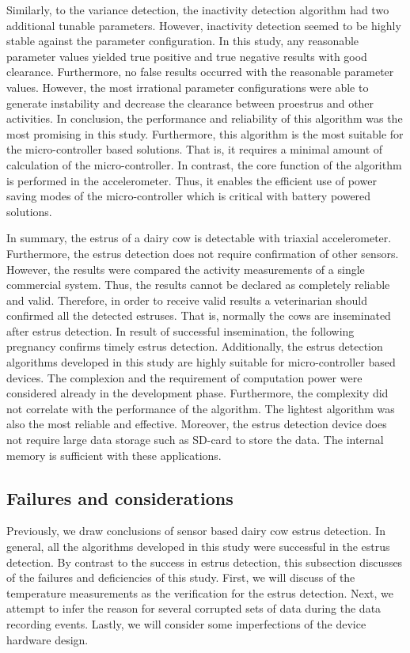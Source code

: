 \documentclass[english,12pt,a4paper,pdftex,elec,utf8]{aaltothesis}
\begin{document}
Similarly, to the variance detection, the inactivity detection algorithm had two additional tunable parameters. However, inactivity detection seemed to be highly stable against the parameter configuration. In this study, any reasonable parameter values yielded true positive and true negative results with good clearance. Furthermore, no false results occurred with the reasonable parameter values. However, the most irrational parameter configurations were able to generate instability and decrease the clearance between proestrus and other activities. In conclusion, the performance and reliability of this algorithm was the most promising in this study. Furthermore, this algorithm is the most suitable for the micro-controller based solutions. That is, it requires a minimal amount of calculation of the micro-controller. In contrast, the core function of the algorithm is performed in the accelerometer. Thus, it enables the efficient use of power saving modes of the micro-controller which is critical with battery powered solutions. 

In summary, the estrus of a dairy cow is detectable with triaxial accelerometer. Furthermore, the estrus detection does not require confirmation of other sensors. However, the results were compared the  activity measurements of a single commercial system. Thus, the results cannot be declared as completely reliable and valid. Therefore, in order to receive valid results a veterinarian should confirmed all the detected estruses. That is, normally the cows are inseminated after estrus detection. In result of successful insemination, the following pregnancy confirms timely estrus detection. Additionally, the estrus detection algorithms developed in this study are highly suitable for micro-controller based devices. The complexion and the requirement of computation power were considered already in the development phase. Furthermore, the complexity did not correlate with the performance of the algorithm. The lightest algorithm was also the most reliable and effective. Moreover, the estrus detection device does not require large data storage such as SD-card to store the data. The internal memory is sufficient with these applications.

\subsection{Failures and considerations}

Previously, we draw conclusions of sensor based dairy cow estrus detection. In general, all the algorithms developed in this study were successful in the estrus detection. By contrast to the success in estrus detection, this subsection discusses of the failures and deficiencies of this study. First, we will discuss of the temperature measurements as the verification for the estrus detection. Next, we attempt to infer the reason for several corrupted sets of data during the data recording events. Lastly, we will consider some imperfections of the device hardware design. 
\end{document}
